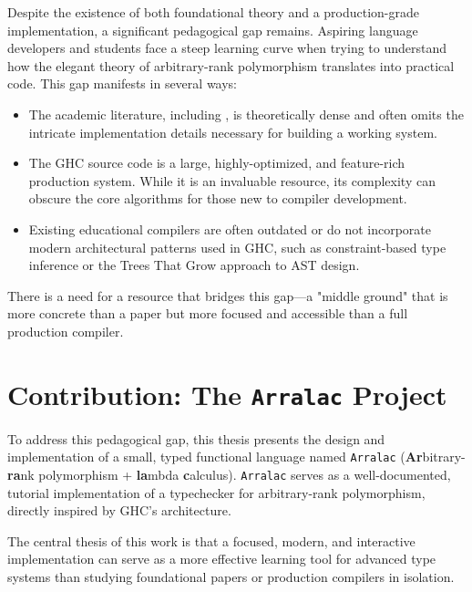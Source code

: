 Despite the existence of both foundational theory and a production-grade implementation, a significant pedagogical gap remains. Aspiring language developers and students face a steep learning curve when trying to understand how the elegant theory of arbitrary-rank polymorphism translates into practical code. This gap manifests in several ways:
\begin{itemize}
    \item The academic literature, including \cite{jones-practical-2007}, is theoretically dense and often omits the intricate implementation details necessary for building a working system.
    \item The GHC source code is a large, highly-optimized, and feature-rich production system. While it is an invaluable resource, its complexity can obscure the core algorithms for those new to compiler development.
    \item Existing educational compilers are often outdated or do not incorporate modern architectural patterns used in GHC, such as constraint-based type inference or the Trees That Grow approach to AST design.
\end{itemize}
There is a need for a resource that bridges this gap---a "middle ground" that is more concrete than a paper but more focused and accessible than a full production compiler.

\section{Contribution: The \texttt{Arralac} Project}

To address this pedagogical gap, this thesis presents the design and implementation of a small, typed functional language named \texttt{Arralac} (\textbf{Ar}bitrary-\textbf{ra}nk polymorphism + \textbf{la}mbda \textbf{c}alculus). \texttt{Arralac} serves as a well-documented, tutorial implementation of a typechecker for arbitrary-rank polymorphism, directly inspired by GHC's architecture.

The central thesis of this work is that a focused, modern, and interactive implementation can serve as a more effective learning tool for advanced type systems than studying foundational papers or production compilers in isolation.


